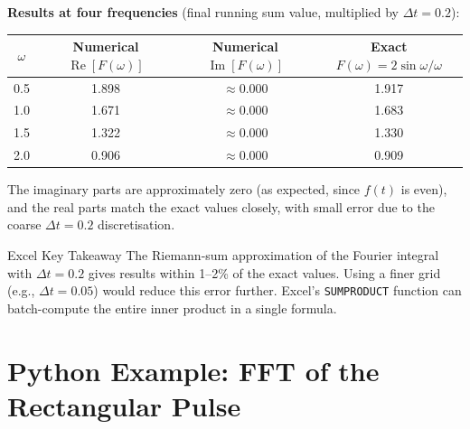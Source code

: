 \documentclass[12pt,a4paper]{article}
\begin{document}
\vspace{0.6em}
\textbf{Results at four frequencies} (final running sum value, multiplied by $\Delta t = 0.2$):

\begin{tabular}{@{} c c c c @{}}
\toprule
$\omega$ & Numerical $\operatorname{Re}[F(\omega)]$ & Numerical $\operatorname{Im}[F(\omega)]$ & Exact $F(\omega) = 2\sin\omega/\omega$ \\
\midrule
0.5 & 1.898 & $\approx 0.000$ & 1.917 \\
1.0 & 1.671 & $\approx 0.000$ & 1.683 \\
1.5 & 1.322 & $\approx 0.000$ & 1.330 \\
2.0 & 0.906 & $\approx 0.000$ & 0.909 \\
\bottomrule
\end{tabular}

\vspace{0.5em}
The imaginary parts are approximately zero (as expected, since $f(t)$ is even), and the real parts
match the exact values closely, with small error due to the coarse $\Delta t = 0.2$ discretisation.

\begin{learnbox}{Excel Key Takeaway}
The Riemann-sum approximation of the Fourier integral with $\Delta t = 0.2$ gives results within
1--2\% of the exact values.
Using a finer grid (e.g., $\Delta t = 0.05$) would reduce this error further.
Excel's \texttt{SUMPRODUCT} function can batch-compute the entire inner product in a single formula.
\end{learnbox}

\section{Python Example: FFT of the Rectangular Pulse}
\end{document}
